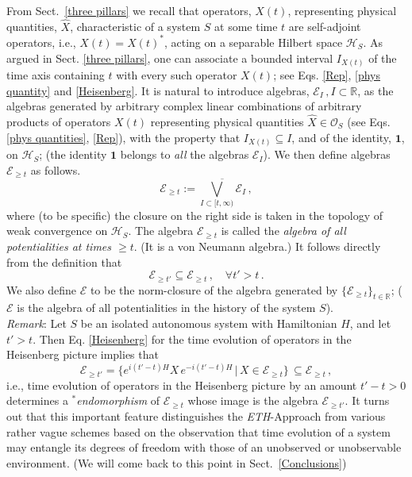 \documentclass[12pt]{article}
\begin{document}
From Sect.~\ref{three pillars} we recall that operators, $X(t)$, representing physical quantities, $\hat{X}$, characteristic 
of a system $S$ at some time $t$  are self-adjoint operators, i.e., $X(t)=X(t)^{*}$, acting on a separable 
Hilbert space $\mathcal{H}_S$. As argued in Sect. \ref{three pillars}, one can associate a bounded interval 
$I_{X(t)}$ of the time axis containing $t$ with every such operator  $X(t)$; see Eqs. \eqref{Rep}, \eqref{phys quantity} 
and \eqref{Heisenberg}. It is natural to introduce algebras, $\mathcal{E}_I\,, I \subset \mathbb{R}$, as the algebras generated 
by arbitrary complex linear combinations of arbitrary products of operators $X(t)$ representing physical 
quantities $\hat{X} \in \mathcal{O}_S$ (see Eqs. \eqref{phys quantities}, \eqref{Rep}), with the property 
that $I_{X(t)} \subseteq I$, and of the identity, $\mathbf{1}$, on $\mathcal{H}_S$; (the identity $\mathbf{1}$ 
belongs to \textit{all} the algebras $\mathcal{E}_I$). We then define algebras $\mathcal{E}_{\geq t}$ as follows.
\begin{equation}\label{events}
\mathcal{E}_{\geq t} := \overline{\bigvee_{I \subset [t, \infty)} \mathcal{E}_I}\,,
\end{equation}
where (to be specific) the closure on the right side is taken in the topology of weak convergence on $\mathcal{H}_S$. 
The algebra $\mathcal{E}_{\geq t}$ is called the \textit{algebra of all potentialities at times $\geq t$}. (It is a von Neumann algebra.) It follows directly from the definition that 
\begin{equation}\label{inclusion}
\mathcal{E}_{\geq t'} \subseteq \mathcal{E}_{\geq t}\,, \quad \forall t' > t\,.
\end{equation}
We also define $\mathcal{E}$ to be the norm-closure of the algebra generated by 
$\big\{ \mathcal{E}_{\geq t} \big\}_{t\in \mathbb{R}}$; ($\mathcal{E}$ is the algebra of all potentialities in the history of the system $S$).\\

\textit{Remark}: Let $S$ be an isolated autonomous system with Hamiltonian $H$, and let $t'>t$. Then Eq. \eqref{Heisenberg} 
for the time evolution of operators in the Heisenberg picture implies that
\begin{equation}\label{automorphism}
\mathcal{E}_{\geq t'}= \big\{e^{i(t'-t)H} X\, e^{-i(t'-t)H} \,\vert\, X\in \mathcal{E}_{\geq t}\big\}\,\subseteq \mathcal{E}_{\geq t}\,,
\end{equation}
i.e., time evolution of operators in the Heisenberg picture by an amount $t'-t>0$ determines a \textit{$^{*}$endomorphism} 
of $\mathcal{E}_{\geq t}$ whose image is the algebra $\mathcal{E}_{\geq t'}$. It turns out that this important feature 
distinguishes the \textit{ETH}-Approach  from various rather vague schemes based on the observation that time evolution 
of a system may entangle its degrees of freedom with those of an unobserved or unobservable environment. (We will 
come back to this point in Sect.~\ref{Conclusions})\\
\end{document}

